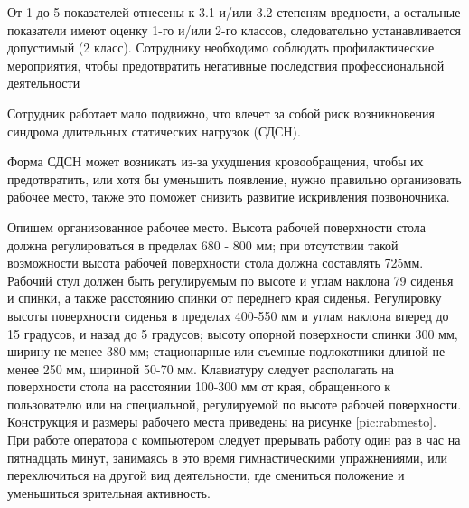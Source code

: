 От 1 до 5 показателей отнесены к 3.1 и/или 3.2 степеням вредности, а остальные показатели имеют оценку 1-го и/или 2-го классов, следовательно устанавливается допустимый (2 класс). Сотруднику необходимо соблюдать профилактические мероприятия, чтобы предотвратить негативные последствия профессиональной деятельности

Сотрудник работает мало подвижно, что влечет за собой риск возникновения синдрома длительных статических нагрузок (СДСН).

Форма СДСН может возникать из-за ухудшения кровообращения, чтобы их предотвратить, или хотя бы уменьшить появление, нужно правильно организовать рабочее место, также это поможет снизить развитие искривления позвоночника.

Опишем организованное рабочее место. Высота рабочей поверхности стола должна регулироваться в пределах 680 - 800 мм; при отсутствии такой возможности высота рабочей поверхности стола должна составлять 725мм. Рабочий стул должен быть регулируемым по высоте и углам наклона 79 сиденья и спинки, а также расстоянию спинки от переднего края сиденья. Регулировку высоты поверхности сиденья в пределах 400-550 мм и углам наклона вперед до 15 градусов, и назад до 5 градусов; высоту опорной поверхности спинки 300 мм, ширину не менее 380 мм; стационарные или съемные подлокотники длиной не менее 250 мм, шириной 50-70 мм. Клавиатуру следует располагать на поверхности стола на расстоянии 100-300 мм от края, обращенного к пользователю или на специальной, регулируемой по высоте рабочей поверхности. Конструкция и размеры рабочего места приведены на рисунке \ref{pic:rabmesto}.
При работе оператора с компьютером следует прерывать работу один раз в час на пятнадцать минут, занимаясь в это время гимнастическими упражнениями, или переключиться на другой вид деятельности, где смениться положение и уменьшиться зрительная активность.


